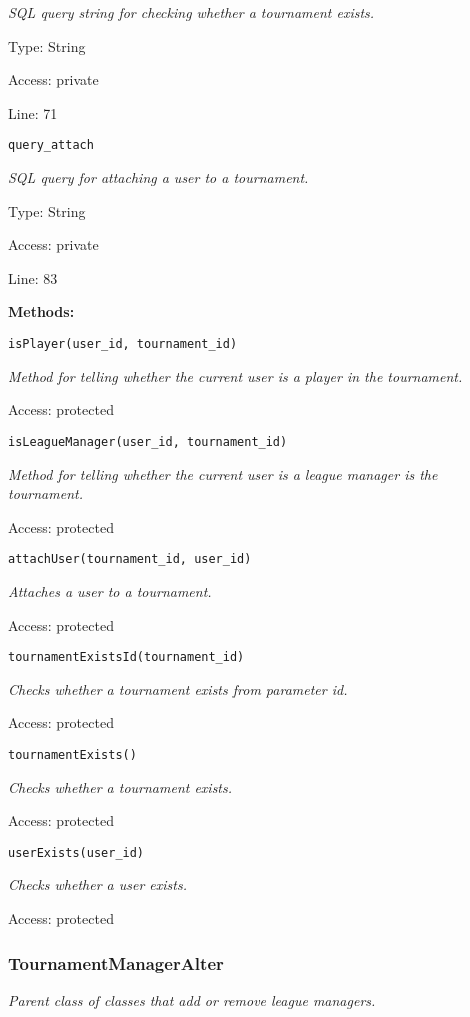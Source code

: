 {\scriptsize
\textit{SQL query string for checking whether a tournament exists.}

Type: String

Access: private

Line: 71

}
\texttt{query\_attach}

{\scriptsize
\textit{SQL query for attaching a user to a tournament.}

Type: String

Access: private

Line: 83

}
\textbf{Methods:}

\texttt{isPlayer(user\_id, tournament\_id)}

{\scriptsize
\textit{Method for telling whether the current user is a player in the tournament.}

Access: protected

}

\texttt{isLeagueManager(user\_id, tournament\_id)}

{\scriptsize
\textit{Method for telling whether the current user is a league manager is the tournament.}

Access: protected

}

\texttt{attachUser(tournament\_id, user\_id)}

{\scriptsize
\textit{Attaches a user to a tournament.}

Access: protected

}

\texttt{tournamentExistsId(tournament\_id)}

{\scriptsize
\textit{Checks whether a tournament exists from parameter id.}

Access: protected

}

\texttt{tournamentExists()}

{\scriptsize
\textit{Checks whether a tournament exists.}

Access: protected

}

\texttt{userExists(user\_id)}

{\scriptsize
\textit{Checks whether a user exists.}

Access: protected

}

\subsubsection{TournamentManagerAlter}
\textit{Parent class of classes that add or remove league managers.}

